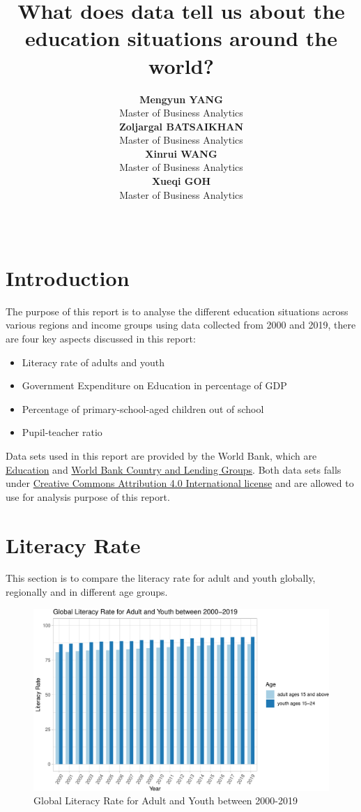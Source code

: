 \documentclass[11pt,a4paper,]{article}
\title{What does data tell us about the education situations around the world?}
\author{\sf\Large\textbf{ Mengyun YANG}\\ {\sf\large Master of Business Analytics\\[0.5cm]} \sf\Large\textbf{ Zoljargal BATSAIKHAN}\\ {\sf\large Master of Business Analytics\\[0.5cm]} \sf\Large\textbf{ Xinrui WANG}\\ {\sf\large Master of Business Analytics\\[0.5cm]} \sf\Large\textbf{ Xueqi GOH}\\ {\sf\large Master of Business Analytics\\[0.5cm]}}
\date{\sf\Date~\Month~\Year}
\makeatletter
\providecommand{\tightlist}{%
  \setlength{\itemsep}{0pt}\setlength{\parskip}{0pt}}
\def\titlepage{\front{\expandafter{\@title}}{\@author}{\@organization}}
\makeatother
\begin{document}
\titlepage

\section*{Introduction}

The purpose of this report is to analyse the different education situations across various regions and income groups using data collected from 2000 and 2019, there are four key aspects discussed in this report:

\begin{itemize}
\tightlist
\item
  Literacy rate of adults and youth
\item
  Government Expenditure on Education in percentage of GDP
\item
  Percentage of primary-school-aged children out of school
\item
  Pupil-teacher ratio
\end{itemize}

Data sets used in this report are provided by the World Bank, which are \href{https://data.worldbank.org/topic/education?end=2018\&start=1998\&view=chart}{Education} and \href{https://datahelpdesk.worldbank.org/knowledgebase/articles/906519-world-bank-country-and-lending-groups}{World Bank Country and Lending Groups}. Both data sets falls under \href{https://datacatalog.worldbank.org/public-licenses}{Creative Commons Attribution 4.0 International license} and are allowed to use for analysis purpose of this report.
\clearpage

\section*{Literacy Rate}

This section is to compare the literacy rate for adult and youth globally, regionally and in different age groups.

\begin{figure}
\centering
\includegraphics{report_files/figure-latex/world-my-1.pdf}
\caption{\label{fig:world-my}Global Literacy Rate for Adult and Youth between 2000-2019}
\end{figure}
\end{document}
